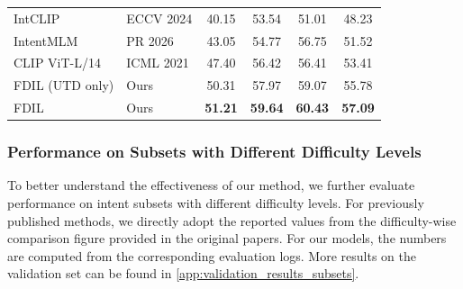 \begin{table}[H]
\begin{tabular}{llcccc}
IntCLIP \cite{leonardis_synergy_2025} & ECCV 2024 & 40.15 & 53.54 & 51.01 & 48.23 \\
IntentMLM \cite{wang_unlocking_2026} & PR 2026 & 43.05 & 54.77 & 56.75 & 51.52 \\
\hline
CLIP ViT-L/14 \cite{radford_learning_2021} & ICML 2021 & 47.40 & 56.42 & 56.41 & 53.41 \\
FDIL (UTD only) & Ours & 50.31 & 57.97 & 59.07 & 55.78 \\
FDIL & Ours & \textbf{51.21} & \textbf{59.64} & \textbf{60.43} & \textbf{57.09} \\
\hline
\end{tabular}
\endgroup
\end{table}

\subsubsection{Performance on Subsets with Different Difficulty Levels}

To better understand the effectiveness of our method, we further evaluate performance on intent subsets with different difficulty levels. For previously published methods, we directly adopt the reported values from the difficulty-wise comparison figure provided in the original papers. For our models, the numbers are computed from the corresponding evaluation logs. More results on the validation set can be found in \ref{app:validation_results_subsets}.


